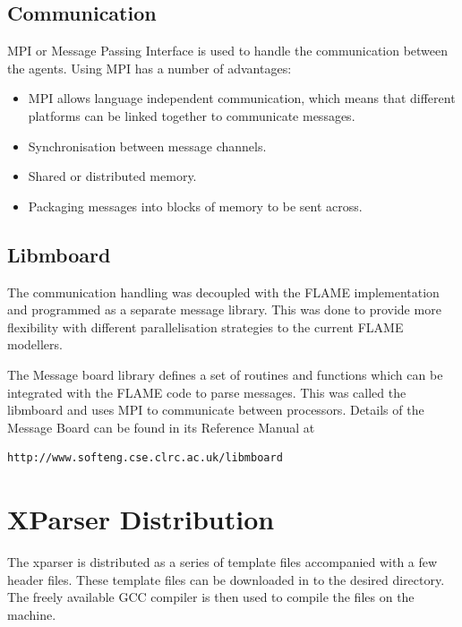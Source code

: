 \documentclass[a4paper,11pt]{article}
\newenvironment{mylisting}
{\begin{list}{}{\setlength{\leftmargin}{1em}}\item\small\bfseries}
{\end{list}}
\begin{document}
\subsection{Communication}

MPI or Message Passing Interface is used to handle the communication
between the agents. Using MPI has a number of advantages:

\begin{itemize}
\item MPI allows language independent communication, which means that different platforms can be linked together to communicate messages.
\item Synchronisation between message channels.
\item Shared or distributed memory.
\item Packaging messages into blocks of memory to be sent across.
\end{itemize}


\subsection{Libmboard}
The communication handling was decoupled with the FLAME
implementation and programmed as a separate message library. This
was done to provide more flexibility with different parallelisation
strategies to the current FLAME modellers.

The Message board library defines a set of routines and functions
which can be integrated with the FLAME code to parse messages. This
was called the libmboard and uses MPI to communicate between
processors. Details of the Message Board can be found in its
Reference Manual at

\begin{mylisting}
\begin{verbatim}
http://www.softeng.cse.clrc.ac.uk/libmboard

\end{verbatim}
\end{mylisting}



\section{XParser Distribution}
The xparser is distributed as a series of template files accompanied
with a few header files. These template files can be downloaded in
to the desired directory. The freely available GCC compiler is then
used to compile the files on the machine.
\end{document}
